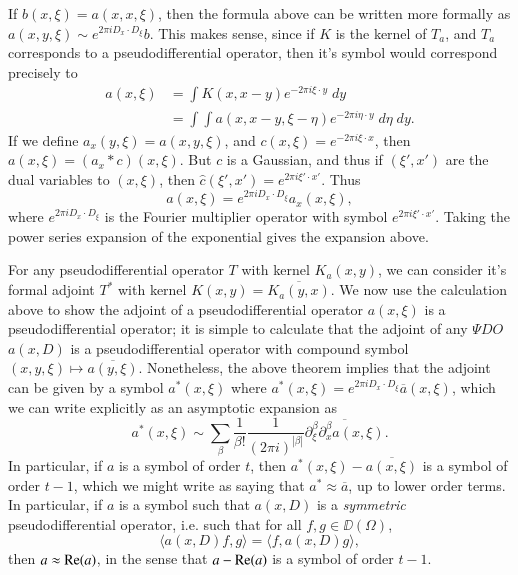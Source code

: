 \begin{remark}
    If $b(x,\xi) = a(x,x,\xi)$, then the formula above can be written more formally as $a(x,y,\xi) \sim e^{2 \pi i D_x \cdot D_\xi} b$. This makes sense, since if $K$ is the kernel of $T_a$, and $T_a$ corresponds to a pseudodifferential operator, then it's symbol would correspond precisely to
    \begin{align*}
        a(x,\xi) &= \int K(x, x - y) e^{-2 \pi i \xi \cdot y}\; dy\\
        &= \int \int a(x,x-y,\xi-\eta) e^{- 2 \pi i \eta \cdot y}\; d\eta\; dy.
    \end{align*}
    If we define $a_x(y,\xi) = a(x,y,\xi)$, and $c(x,\xi) = e^{-2 \pi i \xi \cdot x}$, then $a(x,\xi) = (a_x * c)(x,\xi)$. But $c$ is a Gaussian, and thus if $(\xi', x')$ are the dual variables to $(x,\xi)$, then $\widehat{c}(\xi', x') = e^{2 \pi i \xi' \cdot x'}$. Thus
    \[ a(x,\xi) = e^{2 \pi i D_x \cdot D_\xi} a_x(x,\xi), \]
    where $e^{2 \pi i D_x \cdot D_\xi}$ is the Fourier multiplier operator with symbol $e^{2 \pi i \xi' \cdot x'}$. Taking the power series expansion of the exponential gives the expansion above.
\end{remark}

For any pseudodifferential operator $T$ with kernel $K_a(x,y)$, we can consider it's formal adjoint $T^*$ with kernel $K(x,y) = \overline{K_a(y,x)}$. We now use the calculation above to show the adjoint of a pseudodifferential operator $a(x,\xi)$ is a pseudodifferential operator; it is simple to calculate that the adjoint of any $\Psi DO$ $a(x,D)$ is a pseudodifferential operator with compound symbol $(x,y,\xi) \mapsto \overline{a(y,\xi)}$. Nonetheless, the above theorem implies that the adjoint can be given by a symbol $a^*(x,\xi)$ where $a^*(x,\xi) = e^{2 \pi i D_x \cdot D_\xi} \overline{a}(x,\xi)$, which we can write explicitly as an asymptotic expansion as
%
\[ a^*(x,\xi) \sim \sum_\beta \frac{1}{\beta!} \frac{1}{(2 \pi i)^{|\beta|}} \overline{\partial^\beta_\xi \partial^\beta_x a(x,\xi)}. \]
%
In particular, if $a$ is a symbol of order $t$, then $a^*(x,\xi) - \overline{a(x,\xi)}$ is a symbol of order $t - 1$, which we might write as saying that $a^* \approx \overline{a}$, up to lower order terms. In particular, if $a$ is a symbol such that $a(x,D)$ is a \emph{symmetric} pseudodifferential operator, i.e. such that for all $f,g \in \DD(\Omega)$,
%
\[ \langle a(x,D) f, g \rangle = \langle f, a(x,D) g \rangle, \]
%
then $a \approx \operatorname{\text{Re}}(a)$, in the sense that $a - \operatorname{\text{Re}}(a)$ is a symbol of order $t - 1$.

